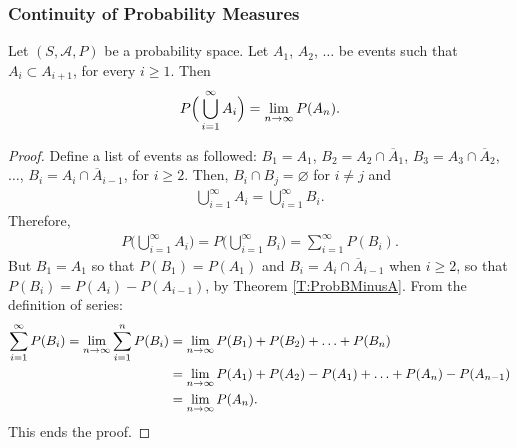 \subsubsection{Continuity of Probability Measures}

\begin{theorem}
Let $(S , \mathcal{A} , P )$ be a probability space. Let $A_1$, $A_2$, $\ldots$ be events such that $A_i \subset A_{i + 1}$, for every $i \geq 1$. Then
	\begin{align*}
	P \Big( \bigcup_{i = 1}^\infty A_i \Big) = \lim_{n \rightarrow \infty} P (A_n ) .
	\end{align*}
\end{theorem}
\begin{proof}
Define a list of events as followed: $B_1 = A_1$, $B_2 = A_2 \cap \overline{A}_1$, $B_3 = A_3 \cap \overline{A}_2$, $\ldots$, $B_i = A_i \cap \overline{A}_{i - 1}$, for $i \geq 2$. Then, $B_i \cap B_j = \varnothing$ for $i \neq j$ and
	\begin{align*}
	\bigcup_{i = 1}^\infty A_i = \bigcup_{i = 1}^\infty B_i .
	\end{align*}
Therefore,
	\begin{align*}
	P \Big( \bigcup_{i = 1}^\infty A_i \Big) = P \Big( \bigcup_{i = 1}^\infty B_i \Big) = \sum_{i = 1}^\infty P (B_i ) .
	\end{align*}
But $B_1 = A_1$ so that $P (B_1) = P (A_1)$ and $B_i = A_i \cap \overline{A}_{i-1}$ when $i \geq 2$, so that $P (B_i) = P (A_i) - P (A_{i -1})$, by Theorem \ref{T:ProbBMinusA}. From the definition of series:
	\begin{align*}
	\sum_{i = 1}^\infty P (B_i ) = \lim_{n \rightarrow \infty} \sum_{i = 1}^n P (B_i) &= \lim_{n \rightarrow \infty} P (B_1) + P (B_2) + \ldots + P (B_n ) \\
	&= \lim_{n \rightarrow \infty} P (A_1 ) + P (A_2) - P (A_1) + \ldots + P (A_n) - P (A_{n-1}) \\
	&= \lim_{n \rightarrow \infty} P (A_n) .
	\end{align*}
This ends the proof.
\end{proof}

